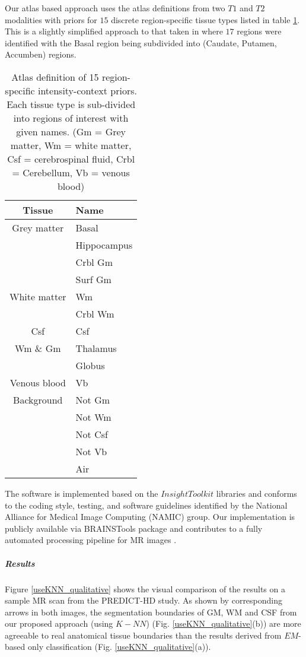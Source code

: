 Our atlas based approach uses the atlas definitions from two $T1$ and $T2$ modalities with priors for $15$ discrete region-specific tissue types listed in table \ref{tab:tissue_names}. This is a slightly simplified approach to that taken in \cite{Kim2013} where $17$ regions were identified with the Basal region being subdivided into (Caudate, Putamen, Accumben) regions.
\begin{table}
\centering
\caption{Atlas definition of 15 region-specific intensity-context priors. Each tissue type is sub-divided into regions of interest with given names. (Gm = Grey matter, Wm = white matter, Csf = cerebrospinal fluid, Crbl = Cerebellum, Vb = venous blood) }
\begin{tabular}{c|l}
\hline \hline
Tissue & Name \\
\hline
Grey matter & Basal \\
 & Hippocampus \\
 & Crbl Gm \\
 & Surf Gm \\ [0.6ex]
White matter & Wm \\
 & Crbl Wm \\ [0.6ex]
Csf & Csf \\ [0.6ex]
Wm \& Gm & Thalamus \\
 & Globus \\ [0.6ex]
Venous blood & Vb \\ [0.6ex]
Background & Not Gm \\
  & Not Wm \\
  & Not Csf \\
  & Not Vb \\
  & Air \\
\hline \hline
\end{tabular}
\label{tab:tissue_names}
\end{table}

The software is implemented based on the $InsightToolkit$ libraries \cite{johnson2015itk1, johnson2015itk2} and conforms to the coding style, testing, and software guidelines identified by the National Alliance for Medical Image Computing (NAMIC) group. Our implementation is publicly available via BRAINSTools package \cite{BRAINSTools} and contributes to a fully automated processing pipeline for MR images \cite{Kim2014,Pierson2011}.

\subparagraph{Results} %

Figure \ref{useKNN_qualitative} shows the visual comparison of the results on a sample MR scan from the PREDICT-HD study. As shown by corresponding arrows in both images, the segmentation boundaries of GM, WM and CSF from our proposed approach (using $K-NN$) (Fig. \ref{useKNN_qualitative}(b)) are more agreeable to real anatomical tissue boundaries than the results derived from $EM$-based only classification (Fig. \ref{useKNN_qualitative}(a)).

